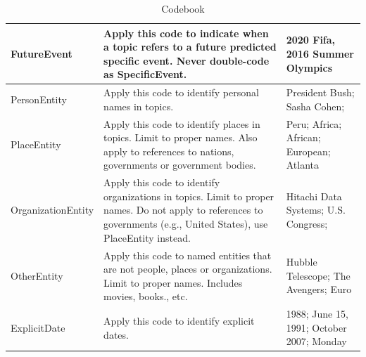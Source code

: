 \documentclass{sig-alternate}
\begin{document}
\begin{table}[H]
\begin{tabular}{| l | p{7cm}  | p{7cm}  |}
FutureEvent & Apply this code to indicate when a topic refers to a future predicted specific event. Never double-code as SpecificEvent. & 2020 Fifa, 2016 Summer Olympics \\ \hline
PersonEntity & Apply this code to identify personal names in topics. & President Bush; Sasha Cohen;  \\ \hline
PlaceEntity & Apply this code to identify places in topics. Limit to proper names. Also apply to references to nations, governments or government bodies. & Peru; Africa; African; European; Atlanta \\ \hline
OrganizationEntity & Apply this code to identify organizations in topics. Limit to proper names. Do not apply to references to governments (e.g., United States), use PlaceEntity instead. & Hitachi Data Systems; U.S. Congress; \\ \hline
OtherEntity & Apply this code to named entities that are not people, places or organizations. Limit to proper names. Includes movies, books., etc. & Hubble Telescope; The Avengers; Euro	\\ \hline
ExplicitDate & Apply this code to identify explicit dates. & 1988; June 15, 1991; October 2007; Monday \\ \hline
\end{tabular}
\caption{Codebook}
\label{table.codebook}
\end{table}
\end{document}
